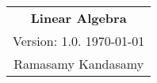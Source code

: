 



\raggedright
\footnotesize
\begin{multicols*}{3}
\setlength{\premulticols}{1pt}
\setlength{\postmulticols}{1pt}
\setlength{\multicolsep}{1pt}
\setlength{\columnsep}{2pt}


\begin{center}
\begin{tabular}{c}
\LARGE{\textbf{Linear Algebra}}\\
Version: 1.0. \today \\
Ramasamy Kandasamy\\
\end{tabular}
\end{center}
















\end{multicols*}
